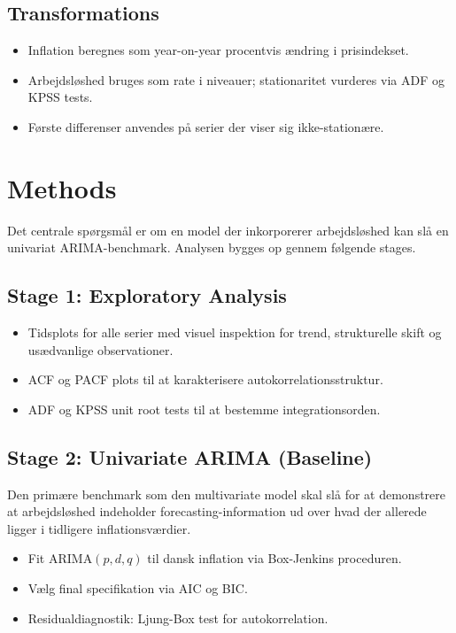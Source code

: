 \subsection{Transformations}

\begin{itemize}[nosep]
    \item Inflation beregnes som year-on-year procentvis ændring i prisindekset.
    \item Arbejdsløshed bruges som rate i niveauer; stationaritet vurderes via ADF og KPSS tests.
    \item Første differenser anvendes på serier der viser sig ikke-stationære.
\end{itemize}

\section{Methods}

Det centrale spørgsmål er om en model der inkorporerer arbejdsløshed kan
slå en univariat ARIMA-benchmark. Analysen bygges op gennem følgende stages.

\subsection{Stage 1: Exploratory Analysis}

\begin{itemize}[nosep]
    \item Tidsplots for alle serier med visuel inspektion for trend,
          strukturelle skift og usædvanlige observationer.
    \item ACF og PACF plots til at karakterisere autokorrelationsstruktur.
    \item ADF og KPSS unit root tests til at bestemme integrationsorden.
\end{itemize}

\subsection{Stage 2: Univariate ARIMA (Baseline)}

Den primære benchmark som den multivariate model skal slå for at
demonstrere at arbejdsløshed indeholder forecasting-information ud over
hvad der allerede ligger i tidligere inflationsværdier.

\begin{itemize}[nosep]
    \item Fit ARIMA$(p,d,q)$ til dansk inflation via Box-Jenkins proceduren.
    \item Vælg final specifikation via AIC og BIC.
    \item Residualdiagnostik: Ljung-Box test for autokorrelation.
\end{itemize}

